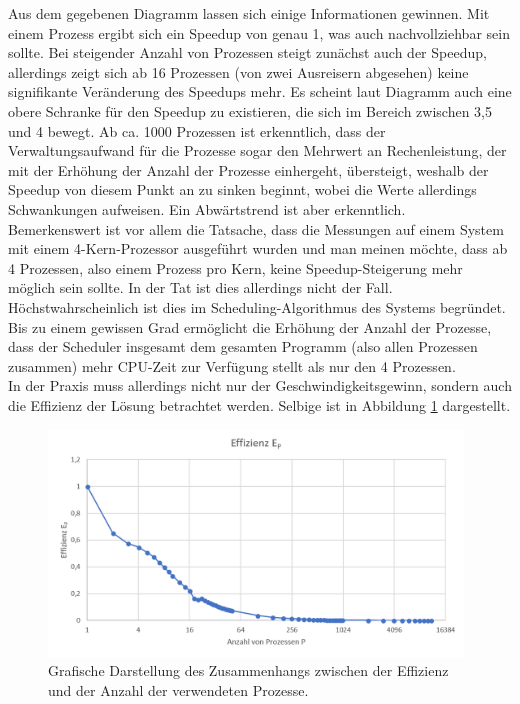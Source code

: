 \begin{description}
						Aus dem gegebenen Diagramm lassen sich einige Informationen gewinnen. Mit einem Prozess ergibt sich ein Speedup von genau 1, was auch nachvollziehbar sein sollte. Bei steigender Anzahl von Prozessen steigt zunächst auch der Speedup, allerdings zeigt sich ab 16 Prozessen (von zwei Ausreisern abgesehen) keine signifikante Veränderung des Speedups mehr. Es scheint laut Diagramm auch eine obere Schranke für den Speedup zu existieren, die sich im Bereich zwischen 3,5 und 4 bewegt. Ab ca. 1000 Prozessen ist erkenntlich, dass der Verwaltungsaufwand für die Prozesse sogar den Mehrwert an Rechenleistung, der mit der Erhöhung der Anzahl der Prozesse einhergeht, übersteigt, weshalb der Speedup von diesem Punkt an zu sinken beginnt, wobei die Werte allerdings Schwankungen aufweisen. Ein Abwärtstrend ist aber erkenntlich.\\
						Bemerkenswert ist vor allem die Tatsache, dass die Messungen auf einem System mit einem 4-Kern-Prozessor ausgeführt wurden und man meinen möchte, dass ab 4 Prozessen, also einem Prozess pro Kern, keine Speedup-Steigerung mehr möglich sein sollte. In der Tat ist dies allerdings nicht der Fall. Höchstwahrscheinlich ist dies im Scheduling-Algorithmus des Systems begründet. Bis zu einem gewissen Grad ermöglicht die Erhöhung der Anzahl der Prozesse, dass der Scheduler insgesamt dem gesamten Programm (also allen Prozessen zusammen) mehr CPU-Zeit zur Verfügung stellt als nur den 4 Prozessen.\\
						In der Praxis muss allerdings nicht nur der Geschwindigkeitsgewinn, sondern auch die Effizienz der Lösung betrachtet werden. Selbige ist in Abbildung \ref{fig:Effizienz_Prozesse} dargestellt.
						
						\begin{figure}
							\centering	
							\includegraphics[width=11cm]{Abbildungen/Effizienz_Prozesse.png}
							\caption{Grafische Darstellung des Zusammenhangs zwischen der Effizienz und der Anzahl der verwendeten Prozesse.}
							\label{fig:Effizienz_Prozesse}
						\end{figure}
						

\end{description}
